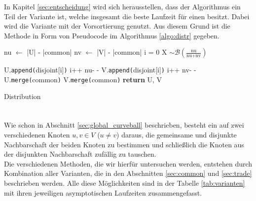 In Kapitel \ref{sec:entscheidung} wird sich herausstellen, dass der Algorithmus \distr{} ein Teil der
Variante ist, welche insgesamt die beste Laufzeit für einen \ct{} besitzt. Dabei wird die Variante
mit der Vorsortierung genutzt. Aus diesem Grund ist die Methode \distr{} in Form von Pseudocode
im Algorithmus \ref{algo:distr} gegeben.


\begin{algorithm}
\begin{algorithmic}[1]
	\State nu $\gets$ |U| - |common| 
	\State nv $\gets$ |V| - |common| 
	\State i = 0
		\State X $\sim \mathcal{B}(\frac{\text{nu}}{\text{nu}+\text{nv}})$  

			\State U.\texttt{append(}disjoint[i]\texttt{)} 
			\State i++
			\State nu- - 
		\Else{} 
			\State V.\texttt{append(}disjoint[i]\texttt{)}
			\State i++
			\State nv- -
		\EndIf{}
	\EndWhile{}	
	\State U.\texttt{merge(}common\texttt{)} 
	\State V.\texttt{merge(}common\texttt{)} 
	\State \textbf{return} U, V
\EndProcedure
\end{algorithmic}
	\caption{Distribution}
	\label{algo:distr}
\end{algorithm}







\section{\ct}
Wie schon in Abschnitt \ref{sec:global_curveball} beschrieben, 
besteht ein \ct{} auf zwei verschiedenen Knoten $u, v \in V$  ($u\neq v$) daraus, die 
gemeinsame und disjunkte Nachbarschaft der beiden Knoten zu bestimmen
und schließlich die Knoten aus der disjunkten Nachbarschaft zufällig zu tauschen.
\\
Die verschiedenen Methoden, die wir hierfür untersuchen werden, 
entstehen durch Kombination aller Varianten, die in den Abschnitten \ref{sec:common} und \ref{sec:trade} beschrieben 
werden. Alle diese Möglichkeiten sind in der Tabelle \ref{tab:varianten} mit ihren jeweiligen asymptotischen
Laufzeiten zusammengefasst.


